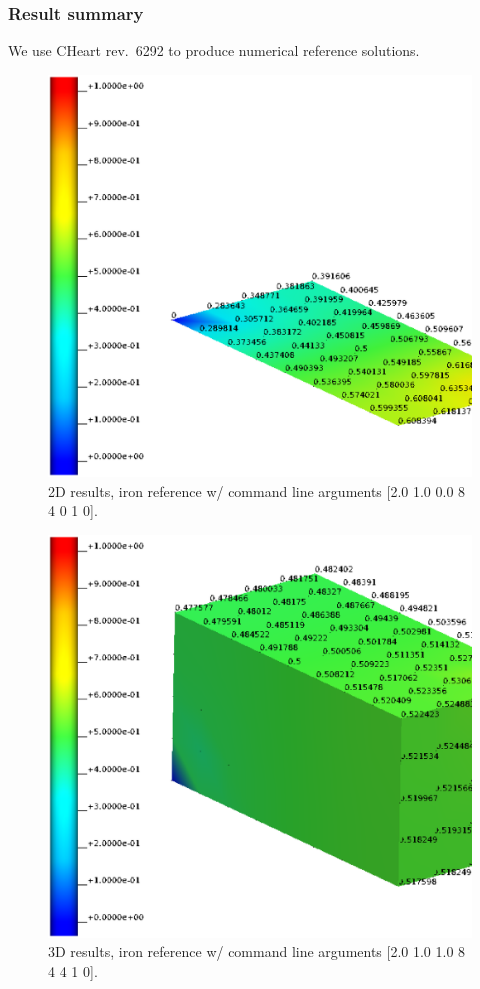 \subsubsection{Result summary}
%
We use CHeart rev.\ 6292 to produce numerical reference solutions.
%


%
\begin{figure}[h!]
    \centering 
    \includegraphics[width=0.9\columnwidth]{examples/example-0002/doc/figures/iron_reference_2D.eps} 
    \caption{2D results, iron reference w/ command line arguments [2.0 1.0 0.0 8 4 0 1 0].}
    \label{example-0002-iron-2D-reference-fig}
\end{figure}
%
\begin{figure}[h!]
    \centering 
    \includegraphics[width=0.9\columnwidth]{examples/example-0002/doc/figures/iron_reference_3D.eps} 
    \caption{3D results, iron reference w/ command line arguments [2.0 1.0 1.0 8 4 4 1 0].}
    \label{example-0002-iron-3D-reference-fig}
\end{figure}
%
